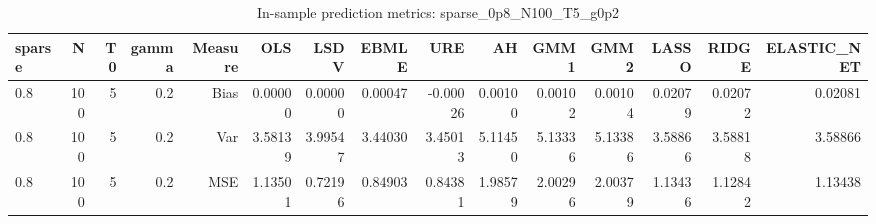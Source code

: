 \begin{table}[!htbp]\centering
\caption{In-sample prediction metrics: sparse_0p8_N100_T5_g0p2}
\label{tab:table2_sparse_0p8_N100_T5_g0p2}
\begin{tabular}{lrrrrrrrrrrrrrr}
\hline
sparse & N & T0 & gamma & Measure & OLS & LSDV & EBMLE & URE & AH & GMM1 & GMM2 & LASSO & RIDGE & ELASTIC_NET \\
\hline
0.8 & 100 & 5 & 0.2 & Bias & 0.00000 & 0.00000 & 0.00047 & -0.00026 & 0.00100 & 0.00102 & 0.00104 & 0.02079 & 0.02072 & 0.02081 \\
0.8 & 100 & 5 & 0.2 & Var & 3.58139 & 3.99547 & 3.44030 & 3.45013 & 5.11450 & 5.13336 & 5.13386 & 3.58866 & 3.58818 & 3.58866 \\
0.8 & 100 & 5 & 0.2 & MSE & 1.13501 & 0.72196 & 0.84903 & 0.84381 & 1.98579 & 2.00296 & 2.00379 & 1.13436 & 1.12842 & 1.13438 \\
\hline
\end{tabular}
\end{table}

